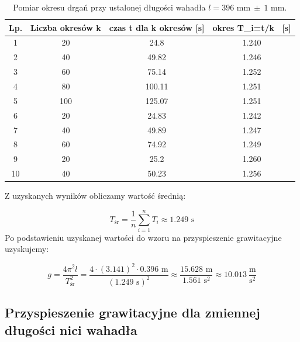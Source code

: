 \documentclass[a4paper,12pts]{article}
\begin{document}
	\begin{table}[!h]
		\centering
		\begin{tabular}{ | c | c | c | c | }
			\hline
			\textrm{Lp.} & \textrm{Liczba okresów } k & \textrm{czas } t \textrm{ dla } k \textrm{ okresów [s]} & \textrm{okres } T_i=t/k \textrm{~[s]} \\ \hline
			1 & 20 & 24.8 & 1.240 \\ \hline
			2 & 40 & 49.82 & 1.246 \\ \hline
			3 & 60 & 75.14 & 1.252 \\ \hline
			4 & 80 & 100.11 & 1.251 \\ \hline
			5 & 100 & 125.07 & 1.251 \\ \hline
			6 & 20 & 24.83 & 1.242 \\ \hline
			7 & 40 & 49.89 & 1.247 \\ \hline
			8 & 60 & 74.92 & 1.249 \\ \hline
			9 & 20 & 25.2 & 1.260 \\ \hline
			10 & 40 & 50.23 & 1.256 \\ \hline
		\end{tabular}
		\caption{Pomiar okresu drgań przy ustalonej długości wahadła $l=396$ mm$~\pm~1$ mm.}
		\label{Tabela1}	
	\end{table}

	Z uzyskanych wyników obliczamy wartość średnią:
	
	\begin{equation}
		T_{\textrm{śr}} = \frac{1}{n} \sum_{i = 1}^{n} T_i \approx 1.249 \textrm{ s}
	\end{equation}
	Po podstawieniu uzyskanej wartości do wzoru na przyspieszenie grawitacyjne uzyskujemy:
	
	\begin{equation}
		g = \frac{4 \pi^2 l}{T^2_{\textrm{śr}}} = \frac{4 \cdot (3.141)^2 \cdot 0.396 \textrm{ m}}{(1.249 \textrm{ s})^2} %
		\approx \frac{15.628 \textrm{ m}}{1.561 \textrm{ s}^2} \approx 10.013 ~\frac{\textrm{m}}{\textrm{s}^2}
	\end{equation}
	\label{gStala}
	
	
	\subsection{Przyspieszenie grawitacyjne dla zmiennej długości nici wahadła}
	
\end{document}
